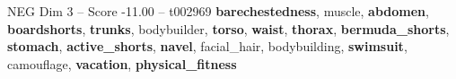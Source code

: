 \begin{textsample}{NEG Dim 3 – Score -11.00 – t002969}  \label{ex:f3_neg_035}
\textbf{barechestedness}, muscle, \textbf{abdomen}, \textbf{boardshorts}, \textbf{trunks}, bodybuilder, \textbf{torso}, \textbf{waist}, \textbf{thorax}, \textbf{bermuda\_shorts}, \textbf{stomach}, \textbf{active\_shorts}, \textbf{navel}, facial\_hair, bodybuilding, \textbf{swimsuit}, camouflage, \textbf{vacation}, \textbf{physical\_fitness}

\end{textsample}
